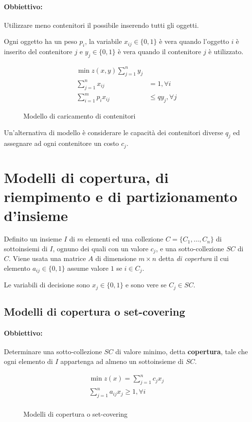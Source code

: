 \documentclass[\main/main.tex]{subfiles}
\begin{document}
\paragraph*{Obbiettivo:} Utilizzare meno contenitori il possibile inserendo tutti gli oggetti.

Ogni oggetto ha un peso $p_i$, la variabile $x_{ij} \in \{0,1\}$ è vera quando l'oggetto $i$ è inserito del contenitore $j$ e $y_j \in \{0,1\}$ è vera quando il contenitore $j$ è utilizzato.

\begin{figure}
  \begin{align*}
    \min z(x,y) \sum_{j=1}^n y_j                    \\
    \sum_{j=1}^n x_{ij}     & = 1, \forall i        \\
    \sum_{i=1}^m p_i x_{ij} & \leq q y_j, \forall j
  \end{align*}
  \caption{Modello di caricamento di contenitori}
\end{figure}

Un'alternativa di modello è considerare le capacità dei contenitori diverse $q_j$ ed assegnare ad ogni contenitore un costo $c_j$.

\section{Modelli di copertura, di riempimento e di partizionamento d'insieme}
Definito un insieme $I$ di $m$ elementi ed una collezione $C = \{C_1, \ldots, C_n\}$ di sottoinsiemi di $I$, ognuno dei quali con un valore $c_j$, e una sotto-collezione $SC$ di $C$. Viene usata una matrice $A$ di dimensione $m\times n$ detta \textit{di copertura} il cui elemento $a_{ij} \in \{0,1\}$ assume valore $1$ se $i \in C_j$.

Le variabili di decisione sono $x_j \in \{0,1\}$ e sono vere se $C_j \in SC$.

\subsection{Modelli di copertura o set-covering}
\paragraph*{Obbiettivo:} Determinare una sotto-collezione $SC$ di valore minimo, detta \textbf{copertura}, tale che ogni elemento di $I$ appartenga ad almeno un sottoinsieme di $SC$.

\begin{figure}
  \begin{align*}
    \min z(x) = \sum_{j=1}^n c_j x_j          \\
    \sum_{j=1}^n a_{ij} x_j \geq 1, \forall i \\
  \end{align*}
  \caption{Modelli di copertura o set-covering}
\end{figure}
\end{document}
